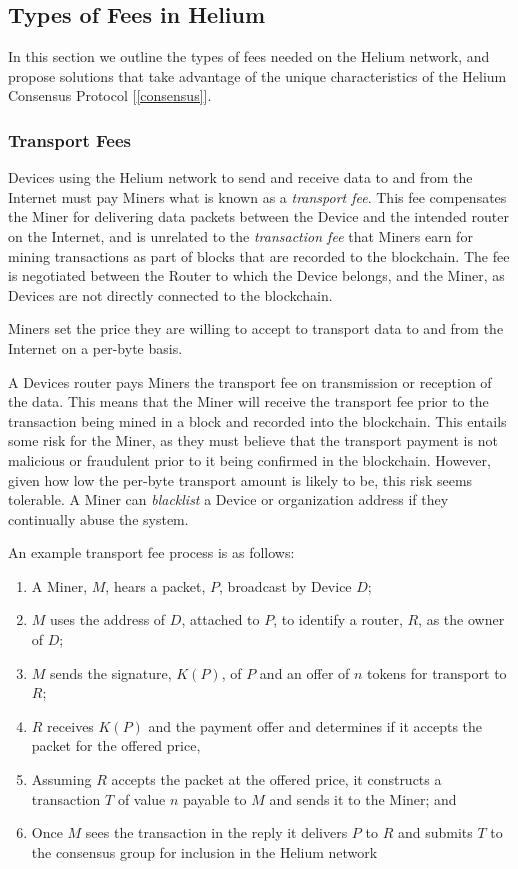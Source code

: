 \documentclass[10pt, nonatbib, nocopyrightspace, reprint]{sigplanconf}
\newcommand{\secref}[1]{[\autoref{#1}]}
\begin{document}
\subsection{Types of Fees in Helium}

In this section we outline the types of fees needed on the Helium network, and propose solutions that take advantage of the unique characteristics of the Helium Consensus Protocol \secref{consensus}.

\subsubsection{Transport Fees}

Devices using the Helium network to send and receive data to and from the Internet must pay Miners what is known as a \emph{transport fee}. This fee compensates the Miner for delivering data packets between the Device and the intended router on the Internet, and is unrelated to the \emph{transaction fee} that Miners earn for mining transactions as part of blocks that are recorded to the blockchain. The fee is negotiated between the Router to which the Device belongs, and the Miner, as Devices are not directly connected to the blockchain.

Miners set the price they are willing to accept to transport data to and from the Internet on a per-byte basis.

A Devices router pays Miners the transport fee on transmission or reception of the data. This means that the Miner will receive the transport fee prior to the transaction being mined in a block and recorded into the blockchain. This entails some risk for the Miner, as they must believe that the transport payment is not malicious or fraudulent prior to it being confirmed in the blockchain. However, given how low the per-byte transport amount is likely to be, this risk seems tolerable. A Miner can \emph{blacklist} a Device or organization address if they continually abuse the system.

An example transport fee process is as follows:

\begin{enumerate}
  \item A Miner, $M$, hears a packet, $P$, broadcast by Device $D$;
  \item $M$ uses the address of $D$, attached to $P$, to identify a router, $R$, as the owner of $D$;
  \item $M$ sends the signature, $K(P)$, of $P$ and an offer of $n$ tokens for transport to $R$;
  \item $R$ receives $K(P)$ and the payment offer and determines if it accepts the packet for the offered price,
  \item Assuming $R$ accepts the packet at the offered price, it constructs a transaction $T$ of value $n$ payable to $M$ and sends it to the Miner; and
  \item Once $M$ sees the transaction in the reply it delivers $P$ to $R$ and submits $T$ to the consensus group for inclusion in the Helium network
\end{enumerate}
\end{document}
